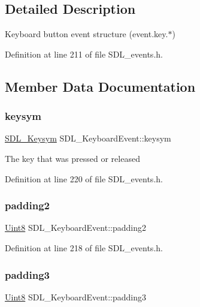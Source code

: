 \subsection{Detailed Description}
Keyboard button event structure (event.\+key.$\ast$) 

Definition at line 211 of file S\+D\+L\+\_\+events.\+h.



\subsection{Member Data Documentation}
\mbox{\label{struct_s_d_l___keyboard_event_a2a57ba820a298f2c02ad5d41fd2b1aa8}} 
\subsubsection{\texorpdfstring{keysym}{keysym}}
{\footnotesize\ttfamily \mbox{\hyperlink{struct_s_d_l___keysym}{S\+D\+L\+\_\+\+Keysym}} S\+D\+L\+\_\+\+Keyboard\+Event\+::keysym}

The key that was pressed or released 

Definition at line 220 of file S\+D\+L\+\_\+events.\+h.

\mbox{\label{struct_s_d_l___keyboard_event_ae270122f757f76171318294afd2c95e6}} 
\subsubsection{\texorpdfstring{padding2}{padding2}}
{\footnotesize\ttfamily \mbox{\hyperlink{_s_d_l__stdinc_8h_a2944638813a090aa23e62f4da842c3e2}{Uint8}} S\+D\+L\+\_\+\+Keyboard\+Event\+::padding2}



Definition at line 218 of file S\+D\+L\+\_\+events.\+h.

\mbox{\label{struct_s_d_l___keyboard_event_ae1831035ef556a7b09efcd2469f26f7a}} 
\subsubsection{\texorpdfstring{padding3}{padding3}}
{\footnotesize\ttfamily \mbox{\hyperlink{_s_d_l__stdinc_8h_a2944638813a090aa23e62f4da842c3e2}{Uint8}} S\+D\+L\+\_\+\+Keyboard\+Event\+::padding3}



